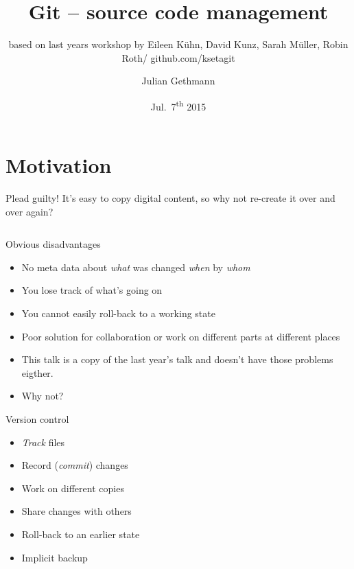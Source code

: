\documentclass{beamer}
\title{Git -- source code management}
\author{Julian Gethmann}
\subtitle{based on last years workshop by Eileen K\"uhn, David Kunz, Sarah M\"uller, Robin Roth/ github.com/ksetagit}
\institute{KSETA Doktorandenworkshop, 7.7.2015}
\date{Jul.~7\textsuperscript{th} 2015}
\begin{document}
\maketitle

\section{Motivation}

\begin{frame}{Plead guilty!}
  It's easy to copy digital content, so why not re-create it over and over
  again?

  \begin{columns}[onlytextwidth]

  \end{columns}
\end{frame}
\begin{frame}{Obvious disadvantages}
  \begin{itemize}
    \item No meta data about \emph{what} was changed \emph{when} by
      \emph{whom}
    \item You lose track of what's going on
    \item You cannot easily roll-back to a working state
    \item Poor solution for collaboration or work on different parts at different places
  \end{itemize}
  \begin{itemize}
    \item This talk is a copy of the last year's talk and doesn't have those problems eigther.
    \item Why not?
  \end{itemize}
\end{frame}
\begin{frame}{Version control}
	\begin{itemize}
		\item \emph{Track} files
		\item Record (\emph{commit}) changes
		\item Work on different copies 
		\item Share changes with others
		\item Roll-back to an earlier state
		\item Implicit backup

	\end{itemize}
\end{frame}
\end{document}
